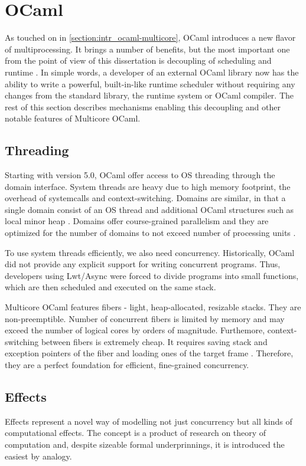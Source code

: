 \documentclass[12pt,a4paper,twoside]{report}
\begin{document}
\section{OCaml}
\label{section:background_ocaml}

As touched on in \ref{section:intr_ocaml-multicore}, OCaml introduces a new flavor of multiprocessing. It brings a number of benefits, but the most important one from the point of view of this dissertation is decoupling of scheduling and runtime \cite{stephen_effective_nodate}. In simple words, a developer of an external OCaml library now has the ability to write a powerful, built-in-like runtime scheduler without requiring any changes from the standard library, the runtime system or OCaml compiler. The rest of this section describes mechanisms enabling this decoupling and other notable features of Multicore OCaml.

\subsection{Threading}
\label{section:fibers}
Starting with version 5.0, OCaml offer access to OS threading through the domain interface. System threads are heavy due to high memory footprint, the overhead of systemcalls and context-switching. Domains are similar, in that a single domain consist of an OS thread and additional OCaml structures such as local minor heap \cite{Sivaramakrishnan2020}. Domains offer course-grained parallelism and they are optimized for the number of domains to not exceed number of processing units \cite{Concurre37:online}.

To use system threads efficiently, we also need concurrency. Historically, OCaml did not provide any explicit support for writing concurrent programs. Thus, developers using Lwt/Async were forced to divide programs into small functions, which are then scheduled and executed on the same stack. 

Multicore OCaml features fibers - light, heap-allocated, resizable stacks. They are non-preemptible. Number of concurrent fibers is limited by memory and may exceed the number of logical cores by orders of magnitude. Furthemore, context-switching between fibers is extremely cheap. It requires saving stack and exception pointers of the fiber and loading ones of the target frame \cite{Sivaramakrishnan2021}. Therefore, they are a perfect foundation for efficient, fine-grained concurrency. 

\subsection{Effects}
\label{section:effects}
Effects represent a novel way of modelling not just concurrency but all kinds of computational effects. The concept is a product of research on theory of computation \cite{Pretnar2015} and, despite sizeable formal underprinnings, it is introduced the easiest by analogy. 
\end{document}
